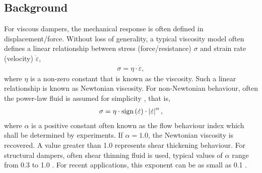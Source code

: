 \subsection{Background}
For viscous dampers, the mechanical response is often defined in displacement/force. Without loss of generality, a typical viscosity model often defines a linear relationship between stress (force/resistance) $\sigma$ and strain rate (velocity) $\dot{\varepsilon}$,
\begin{gather}
\sigma=\eta\cdot\dot{\varepsilon},
\end{gather}
where $\eta$ is a non-zero constant that is known as the viscosity. Such a linear relationship is known as Newtonian viscosity. For non-Newtonian behaviour, often the power-law fluid is assumed for simplicity \cite{Wu2016}, that is,
\begin{gather}
\sigma=\eta\cdot\text{sign}\left(\dot{\varepsilon}\right)\cdot\left\lvert\dot{\varepsilon}\right\rvert^{\alpha},
\end{gather}
where $\alpha$ is a positive constant often known as the flow behaviour index which shall be determined by experiments. If $\alpha=1.0$, the Newtonian viscosity is recovered. A value greater than \num{1.0} represents shear thickening behaviour. For structural dampers, often shear thinning fluid is used, typical values of $\alpha$ range from \num{0.3} to \num{1.0} \cite{Lee2001}. For recent applications, this exponent can be as small as \num{0.1} \cite{Lago2018}.
